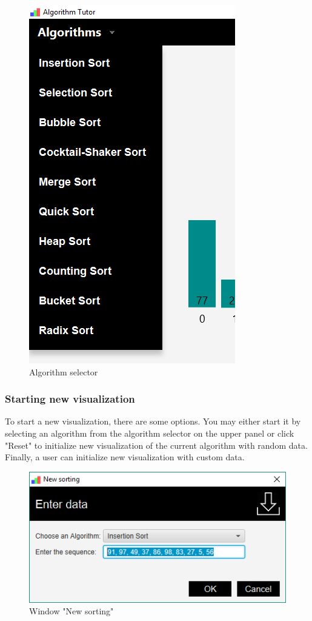 \documentclass[
  field=inf,
  biblatex,
  language=english,
  glossaries,
  theorems=false,
  index
]{kidiplom}
\begin{document}
\begin{figure}[H]
\begin{center}
	\includegraphics[scale=0.3]{img/ui/Selector.png}
	\caption{Algorithm selector}\label{fig:selector}
\end{center}
\end{figure}

\subsubsection{Starting new visualization}
To start a new visualization, there are some options. You may either start it by selecting an algorithm from the algorithm selector on the upper panel or click "Reset" to initialize new visualization of the current algorithm with random data. Finally, a user can initialize new visualization with custom data.

\begin{figure}[H]
\begin{center}
	\includegraphics[scale=0.5]{img/ui/WindowNew.png}
	\caption{Window "New sorting"}\label{fig:new}
\end{center}
\end{figure}
\end{document}
